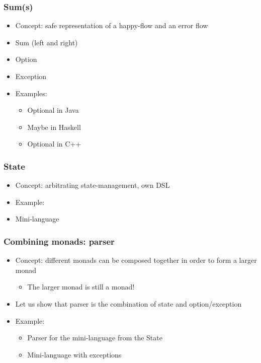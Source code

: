 \documentclass{article}
\begin{document}
\subsubsection{Sum(s)}\label{sums}

\begin{itemize}[noitemsep]

	\item
	Concept: safe representation of a happy-flow and an error flow\\
	\item
	Sum (left and right)
	\item
	Option
	\item
	Exception
	\item
	Examples:
	
	\begin{itemize}[noitemsep]

		\item
		Optional in Java
		\item
		Maybe in Haskell
		\item
		Optional in C++
	\end{itemize}
\end{itemize}

\subsubsection{State}\label{state}

\begin{itemize}[noitemsep]

	\item
	Concept: arbitrating state-management, own DSL
	\item
	Example:
	\item
	Mini-language
\end{itemize}

\subsubsection{Combining monads: parser}\label{combining-monads-parser}

\begin{itemize}[noitemsep]

	\item
	Concept: different monads can be composed together in order to form a
	larger monad
	
	\begin{itemize}[noitemsep]

		\item
		The larger monad is still a monad!
	\end{itemize}
	\item
	Let us show that parser is the combination of state and
	option/exception
	\item
	Example:
	
	\begin{itemize}[noitemsep]

		\item
		Parser for the mini-language from the State
		\item
		Mini-language with exceptions
	\end{itemize}
\end{itemize}
\end{document}
